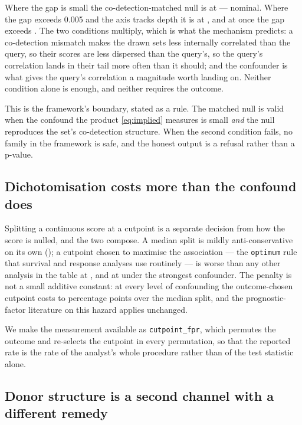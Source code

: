 \documentclass[11pt]{article}
\newcommand{\code}[1]{\texttt{#1}}
\begin{document}
Where the gap is small the co-detection-matched null is at
\boundaryTightAnyOutRate{} --- nominal. Where the gap exceeds 0.005 and the axis
tracks depth it is at \boundaryTightAxisInRate, and at \boundaryLooseAxisInRate{}
once the gap exceeds \boundaryLooseAxisGap{}. The two conditions multiply, which is what the
mechanism predicts: a co-detection mismatch makes the drawn sets less
internally correlated than the query, so their scores are less dispersed than
the query's, so the query's correlation lands in their tail more often than it
should; and the confounder is what gives the query's correlation a magnitude
worth landing on. Neither condition alone is enough, and neither requires the
outcome.

This is the framework's boundary, stated as a rule. The matched null is valid
when the confound the product \eqref{eq:implied} measures is small \emph{and}
the null reproduces the set's co-detection structure. When the second condition
fails, no family in the framework is safe, and the honest output is a refusal
rather than a p-value.

\subsection{Dichotomisation costs more than the confound does}
\label{sec:dichotomy}

Splitting a continuous score at a cutpoint is a separate decision from how the
score is nulled, and the two compose. A median split is mildly anti-conservative
on its own (\cutmedRate{}); a cutpoint chosen to maximise the association --- the
\code{optimum} rule that survival and response analyses use routinely --- is
worse than any other analysis in the table at \cutoptRate, and at
\confCCutopt{} under the strongest confounder. The penalty is not a small
additive constant: at every level of confounding the outcome-chosen cutpoint
costs \cutCostMinPct{} to \cutCostMaxPct{} percentage points over the median split, and the
prognostic-factor literature on this hazard \citep{altman1994,royston2006}
applies unchanged.

We make the measurement available as \code{cutpoint\_fpr}, which permutes the
outcome and re-selects the cutpoint in every permutation, so that the reported
rate is the rate of the analyst's whole procedure rather than of the test
statistic alone.

\subsection{Donor structure is a second channel with a different remedy}
\end{document}
